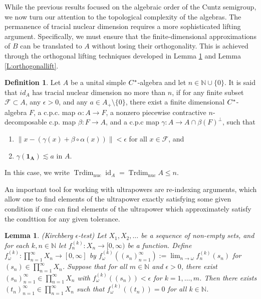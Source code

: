 \documentclass[12pt]{amsart}
\theoremstyle{plain}
\newtheorem{lem}[thm]{Lemma}
\theoremstyle{definition}
\newtheorem{defn}[thm]{Definition}
\def\id{\operatorname{id}}
\def\Trdim{\operatorname{Trdim}}
\def\nuc{\operatorname{nuc}}
\newcommand{\mc}{\mathcal}
\numberwithin{equation}{section}
\begin{document}
While the previous results focused on the algebraic order of the Cuntz semigroup, we now turn our attention to the topological complexity of the algebras. The permanence of tracial nuclear dimension requires a more sophisticated lifting argument. Specifically, we must ensure that the finite-dimensional approximations of $B$ can be translated to $A$ without losing their orthogonality. This is achieved through the orthogonal lifting techniques developed in Lemma \ref{L:Kirchberg} and Lemma \ref{L:orthogonallift}. 

\begin{defn}\cite[Definition 7.6]{FL}
Let $A$ be a unital simple $C\sp*$-algebra and let $n \in \mathbb{N}\cup \{0\}$. It is said that $id_A$ has tracial nuclear dimension no more than $n$, if for any finite subset $\mc{F} \subset A $, any $\epsilon >0$, and any $a \in A_{+}\setminus \{0\}$, there exist a finite dimensional $C\sp*$-algebra $F$, a c.p.c. map $\alpha: A \to F$, a nonzero piecewise contractive $n$-decomposable c.p. map $\beta: F \to A$, and a c.p.c map $\gamma: A \to A\cap \beta(F)^{\perp}$, such that 
\begin{enumerate}
\item $ \|x - (\gamma(x)+ \beta \circ \alpha (x)) \| < \epsilon$ for all $x\in \mc{F}$, and 
\item $\gamma(\mathbf{1_A}) \lesssim a$ in $A$. 
\end{enumerate}
In this case, we write $\Trdim_{\nuc} \id_A = \Trdim_{\nuc} A \le n$. 
\end{defn}
An important tool for working with ultrapowers are re-indexing arguments, which allow one to find elements of the ultrapower exactly satisfying some given condition if one can find elements of the ultrapower which approximately satisfy the condttion for any given tolerance.  
\begin{lem}(Kirchberg $\epsilon$-test)\cite[Lemma 1.8]{CE} \cite[Lemma A.1]{K}\label{L:Kirchberg}
Let $X_1, X_2, \dots $ be a sequence of non-empty sets, and  for each $k, n \in \mathbb{N}$ let $f^{(k)}_n: X_n \to [0,\infty)$ be a function. Define $f^{(k)}_{\omega}: \prod_{n=1}^{\infty} X_n \to [0, \infty]$ by $f^{(k)}_{\omega} ((s_n)_{n=1}^{\infty}):= \lim_{n \to \omega} f^{(k)}_n (s_n)$  for $(s_n) \in \prod_{n=1}^{\infty}X_n$. Suppose that for all $m \in \mathbb{N}$ and $\epsilon>0$, there exist $(s_n)_{n=1}^{\infty} \in \prod_{n=1}^{\infty}X_n$ with $f^{(k)}_{\omega}((s_n)) < \epsilon$ for $k=1,\dots, m$. Then there exists $(t_n)_{n=1}^{\infty} \in \prod_{n=1}^{\infty}X_n$ such that $f^{(k)}_{\omega} ((t_n))=0$ for all $k \in \mathbb{N}$. 
\end{lem}
\end{document}
